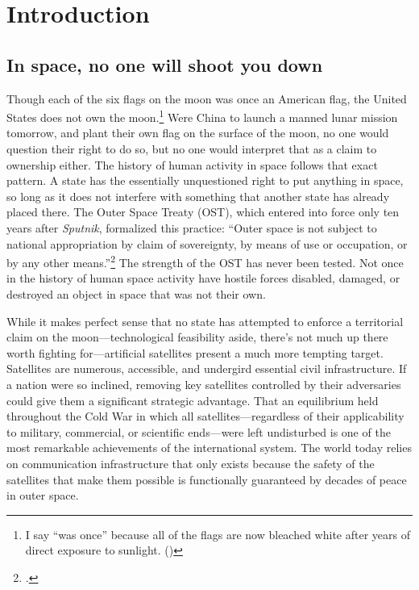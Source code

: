 \documentclass{report}
\begin{document}
\section{Introduction}
\subsection{In space, no one will shoot you down}
Though each of the six flags on the moon was once an American flag, the United States does not own the moon.\footnote{I say ``was once'' because all of the flags are now bleached white after years of direct exposure to sunlight. (\cite{spudis_faded_2011})} Were China to launch a manned lunar mission tomorrow, and plant their own flag on the surface of the moon, no one would question their right to do so, but no one would interpret that as a claim to ownership either. The history of human activity in space follows that exact pattern. A state has the essentially unquestioned right to put anything in space, so long as it does not interfere with something that another state has already placed there. The Outer Space Treaty (OST), which entered into force only ten years after \emph{Sputnik}, formalized this practice: ``Outer space \textelp{} is not subject to national appropriation by claim of sovereignty, by means of use or occupation, or by any other means.''\footcite{noauthor_outer_1966} The strength of the OST has never been tested. Not once in the history of human space activity have hostile forces disabled, damaged, or destroyed an object in space that was not their own.

While it makes perfect sense that no state has attempted to enforce a territorial claim on the moon---technological feasibility aside, there's not much up there worth fighting for---artificial satellites present a much more tempting target. Satellites are numerous, accessible, and undergird essential civil infrastructure. If a nation were so inclined, removing key satellites controlled by their adversaries could give them a significant strategic advantage. That an equilibrium held throughout the Cold War in which all satellites---regardless of their applicability to military, commercial, or scientific ends---were left undisturbed is one of the most remarkable achievements of the international system. The world today relies on communication infrastructure that only exists because the safety of the satellites that make them possible is functionally guaranteed by decades of peace in outer space.
\end{document}
